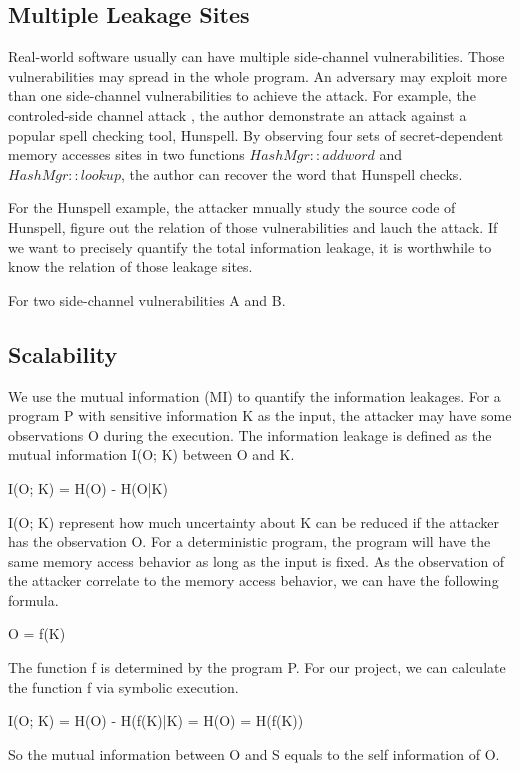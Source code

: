 \subsection{Multiple Leakage Sites}
Real-world software usually can have multiple side-channel vulnerabilities. Those vulnerabilities 
may spread in the whole program. An adversary may exploit more than one side-channel vulnerabilities 
to achieve the attack. For example, the controled-side channel attack \cite{7163052}, the author 
demonstrate an attack against a popular spell checking tool, Hunspell. By observing four sets 
of secret-dependent memory accesses sites in two functions $HashMgr::addword$ and $HashMgr::lookup$, 
the author can recover the word that Hunspell checks.

For the Hunspell example, the attacker mnually study the source code of Hunspell, figure out
the relation of those vulnerabilities and lauch the attack. If we want to precisely quantify the
total information leakage, it is worthwhile to know the relation of those leakage sites. 

For two side-channel vulnerabilities A and B.

\subsection{Scalability}



We use the mutual information (MI) to quantify the information leakages. 
For a program P with sensitive information K as the input, the attacker may have some observations O during the execution. 
The information leakage is defined as the mutual information I(O; K) between O and K.

I(O; K) = H(O) - H(O|K)

I(O; K) represent how much uncertainty about K can be reduced if the attacker has the observation O.
For a deterministic program, the program will have the same memory access behavior as long as the input is fixed. 
As the observation of the attacker correlate to the memory access behavior, 
we can have the following formula.

O = f(K)

The function f is determined by the program P. For our project, we can calculate the function f via symbolic execution.

I(O; K) = H(O) - H(f(K)|K) = H(O) = H(f(K))

So the mutual information between O and S equals to the self information of O. 

